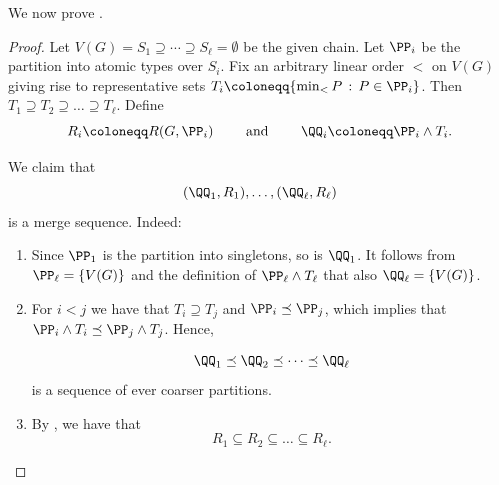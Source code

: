 We now prove .

\lembettermw*

\begin{proof}
    Let
    $V(G)=S_1\supseteq\cdots\supseteq S_\ell=\emptyset$ be the given chain.
    Let $\PP_i$ be the partition into atomic types over $S_i$.
    Fix an arbitrary linear order $<$ on $V(G)$
    giving rise to representative sets $T_i \coloneqq \{\min_< P \,:\, P \in \PP_i\}$.
    Then $T_1\supseteq T_2\supseteq \dots \supseteq T_\ell$.
    Define $$R_i \coloneqq R(G,\PP_i)\qquad\text{ and }\qquad\QQ_i \coloneqq \PP_i \wedge T_i.$$

    We claim that
    \[
        (\QQ_1, R_1), \ldots, (\QQ_\ell, R_\ell)
    \]
    is a merge sequence.  Indeed:
    \begin{enumerate}
        \item Since $\PP_1$ is the partition into singletons, so is
        $\QQ_1$.
        It follows from $\PP_\ell=\{V(G)\}$ and the definition of $\PP_\ell \wedge T_\ell$ that also
        $\QQ_\ell=\{V(G)\}$.

        \item For $i<j$ we have that $T_i\supseteq T_j$ and $\PP_i\preceq \PP_j$, which implies
that  $\PP_i\wedge T_i\preceq \PP_j\wedge T_j$. Hence,

    \[
        \QQ_1 \preceq \QQ_2 \preceq \dots \preceq \QQ_\ell
    \]
    is a sequence of ever coarser partitions.

    \item By , we have that
    \[
        R_1 \subseteq R_2 \subseteq \dots \subseteq R_\ell.
    \]


\end{enumerate}
\end{proof}
